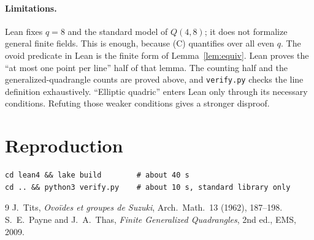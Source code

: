 \documentclass[11pt]{article}
\theoremstyle{definition}
\theoremstyle{remark}
\begin{document}
\paragraph{Limitations.}
Lean fixes $q=8$ and the standard model of $Q(4,8)$; it does not formalize
general finite fields. This is enough, because (C) quantifies over all even
$q$. The ovoid predicate in Lean is the finite form of Lemma~\ref{lem:equiv}.
Lean proves the ``at most one point per line'' half of that lemma. The
counting half and the generalized-quadrangle counts are proved above, and
\texttt{verify.py} checks the line definition exhaustively. ``Elliptic
quadric'' enters Lean only through its necessary conditions. Refuting those
weaker conditions gives a stronger disproof.

\section{Reproduction}
\begin{verbatim}
cd lean4 && lake build        # about 40 s
cd .. && python3 verify.py    # about 10 s, standard library only
\end{verbatim}

\begin{thebibliography}{9}
 J.~Tits, \emph{Ovo\"ides et groupes de Suzuki},
Arch.\ Math.\ 13 (1962), 187--198.
 S.~E.~Payne and J.~A.~Thas, \emph{Finite Generalized Quadrangles},
2nd ed., EMS, 2009.
\end{thebibliography}
\end{document}
